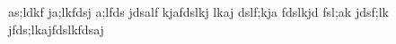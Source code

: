 as;ldkf ja;lkfdsj a;lfds jdsalf kjafdslkj lkaj
dslf;kja fdslkjd fsl;ak jdsf;lk
jfds;lkajfdslkfdsaj 
